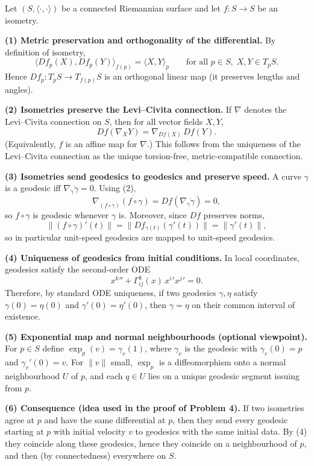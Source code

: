\begin{solution}
Let $(S,\langle\cdot,\cdot\rangle)$ be a connected Riemannian surface and let $f:S\to S$ be an isometry.

\medskip
\textbf{(1) Metric preservation and orthogonality of the differential.}
By definition of isometry,
\[
\langle Df_p(X),Df_p(Y)\rangle_{f(p)}=\langle X,Y\rangle_p
\qquad\text{for all }p\in S,\;X,Y\in T_pS.
\]
Hence $Df_p:T_pS\to T_{f(p)}S$ is an orthogonal linear map (it preserves lengths and angles).

\medskip
\textbf{(2) Isometries preserve the Levi--Civita connection.}
If $\nabla$ denotes the Levi--Civita connection on $S$, then for all vector fields $X,Y$,
\[
Df(\nabla_X Y)=\nabla_{Df(X)}\,Df(Y).
\]
(Equivalently, $f$ is an affine map for $\nabla$.) This follows from the uniqueness of the Levi--Civita
connection as the unique torsion-free, metric-compatible connection.

\medskip
\textbf{(3) Isometries send geodesics to geodesics and preserve speed.}
A curve $\gamma$ is a geodesic iff $\nabla_{\dot\gamma}\dot\gamma=0$.
Using (2),
\[
\nabla_{\dot{(f\circ\gamma)}}\dot{(f\circ\gamma)}
= Df(\nabla_{\dot\gamma}\dot\gamma)=0,
\]
so $f\circ\gamma$ is geodesic whenever $\gamma$ is. Moreover, since $Df$ preserves norms,
\[
\|(f\circ\gamma)'(t)\|=\|Df_{\gamma(t)}(\gamma'(t))\|=\|\gamma'(t)\|,
\]
so in particular unit-speed geodesics are mapped to unit-speed geodesics.

\medskip
\textbf{(4) Uniqueness of geodesics from initial conditions.}
In local coordinates, geodesics satisfy the second-order ODE
\[
x^{k}{}'' + \Gamma^k_{ij}(x)\,x^i{}'x^j{}' = 0.
\]
Therefore, by standard ODE uniqueness, if two geodesics $\gamma,\eta$ satisfy
$\gamma(0)=\eta(0)$ and $\gamma'(0)=\eta'(0)$, then $\gamma=\eta$ on their common interval of existence.

\medskip
\textbf{(5) Exponential map and normal neighbourhoods (optional viewpoint).}
For $p\in S$ define $\exp_p(v)=\gamma_v(1)$, where $\gamma_v$ is the geodesic with
$\gamma_v(0)=p$ and $\gamma_v'(0)=v$.
For $\|v\|$ small, $\exp_p$ is a diffeomorphism onto a normal neighbourhood $U$ of $p$,
and each $q\in U$ lies on a unique geodesic segment issuing from $p$.

\medskip
\textbf{(6) Consequence (idea used in the proof of Problem 4).}
If two isometries agree at $p$ and have the same differential at $p$, then they send every geodesic
starting at $p$ with initial velocity $v$ to geodesics with the same initial data.
By (4) they coincide along these geodesics, hence they coincide on a neighbourhood of $p$,
and then (by connectedness) everywhere on $S$.


\end{solution}
